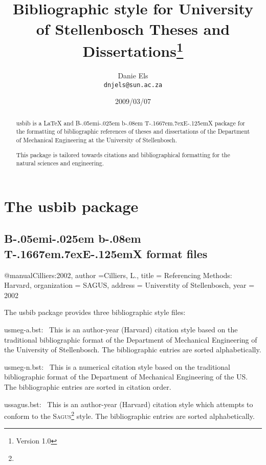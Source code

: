 \documentclass[a4paper,UKenglish]{article}
\title{%
       \USbib{}\\[1ex]
       \large
       Bibliographic style for University of
       Stellenbosch Theses and Dissertations\thanks{Version 1.0}}
\author{Danie Els\\[1ex]
        \normalfont \texttt{dnjels@sun.ac.za}}
\date{2009/03/07}
\makeatletter
\newlength{\mytab}
\newcommand*{\@tempfile}{\jobname.tmp}
\newcommand*{\bibfilename}{\jobname}
\def\@BibVerb{%
       \begingroup
          \@bsphack
          \immediate\openout \verbatim@out \@tempfile
          \let\do\@makeother\dospecials\catcode`\^^M\active
          \def\verbatim@processline{%
             \immediate\write\verbatim@out{\the\verbatim@line}%
             \immediate\write\bibtex@out{\the\verbatim@line}}%
          \verbatim@start}
\def\end@BibVerb{%
      \immediate\closeout\verbatim@out\@esphack
      \endgroup}
\newenvironment{BibVerb*}%
      {\@BibVerb}%
      {\end@BibVerb}
\newcommand{\Descriptionlabel}[1]{{#1}{ }\hfil}
\newenvironment{Description}[1][\hspace*{\mytab}]{%
      \list{}{%
         \setlength{\topsep}{\smallskipamount}%
         \setlength{\partopsep}{\z@skip}%
         \setlength{\parsep}{\z@skip}%
         \setlength{\itemsep}{\smallskipamount}%
         \setlength{\itemindent}{0pt}%
         \setlength{\labelsep}{0pt}%
         \settowidth{\labelwidth}{#1}%
         \setlength{\leftmargin}{\labelwidth}%
         \addtolength{\leftmargin}{\labelsep}%
         \addtolength{\leftmargin}{-\itemindent}%
         \let\makelabel\Descriptionlabel}%
      }{\endlist}
\newcommand*{\pkg}[1]{\textsf{#1}}
\def\BibTeX{{\rm B\kern-.05em{\sc i\kern-.025em b}\kern-.08em
    T\kern-.1667em\lower.7ex\hbox{E}\kern-.125emX}}
\newcommand{\USbib}{\pkg{usbib}}
\makeatother
\begin{document}
\maketitle

\nobibliography{\bibfilename}

\begin{abstract}
\USbib{} is a \LaTeX{} and \BibTeX{} package for the formatting of
bibliographic references of theses and dissertations of the
Department of Mechanical Engineering at the University of
Stellenbosch.

This package is tailored towards citations and bibliographical
formatting for the natural sciences and engineering.
\end{abstract}

\clearpage
\tableofcontents
\clearpage

\section{The \USbib{} package}
\subsection{\BibTeX{} format files}

\begin{BibVerb*}
@manual{Cilliers:2002,
   author       ={Cilliers, L.},
   title        = {Referencing Methods: Harvard},
   organization = {\mbox{SAGUS}},
   address      = {Universtity of Stellenbosch},
   year         = {2002}}
\end{BibVerb*}

The \USbib{} package provides three bibliographic style files:
\begin{Description}
  \item[\normalfont\pkg{usmeg-a.bst}\footnotemark:~]%
     This is an author-year (Harvard) citation style based on the
     traditional bibliographic format of the Department of
     Mechanical Engineering of the University of Stellenbosch. The
     bibliographic entries are sorted alphabetically.

  \item[\normalfont\pkg{usmeg-n.bst}:~]
     This is a numerical citation style based on the
     traditional bibliographic format of the Department of
     Mechanical Engineering of the US. The
     bibliographic entries are sorted in citation order.

  \item[\normalfont\pkg{ussagus.bst}:~]
     This is an author-year (Harvard) citation style which attempts to
     conform to the \textsc{Sagus}\footnote{}
     style. The bibliographic entries are sorted alphabetically.
\end{Description}
\end{document}
